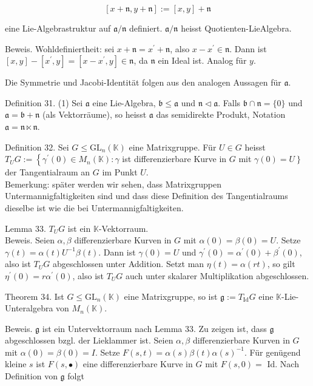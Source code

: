 \documentclass[10pt, letterpaper]{article}
\begin{document}
$$
[x+\mathfrak{n}, y+\mathfrak{n}]:=[x, y]+\mathfrak{n}
$$

eine Lie-Algebrastruktur auf $\mathfrak{a} / \mathfrak{n}$ definiert. $\mathfrak{a} / \mathfrak{n}$ heisst Quotienten-LieAlgebra.

Beweis. Wohldefiniertheit: sei $x+\mathfrak{n}=x^{\prime}+\mathfrak{n}$, also $x-x^{\prime} \in \mathfrak{n}$. Dann ist $[x, y]-\left[x^{\prime}, y\right]=\left[x-x^{\prime}, y\right] \in \mathfrak{n}$, da $\mathfrak{n}$ ein Ideal ist. Analog für $y$.

Die Symmetrie und Jacobi-Identität folgen aus den analogen Aussagen für $\mathfrak{a}$.

Definition 31. (1) Sei $\mathfrak{a}$ eine Lie-Algebra, $\mathfrak{b} \leq \mathfrak{a}$ und $\mathfrak{n} \triangleleft \mathfrak{a}$. Falls $\mathfrak{b} \cap \mathfrak{n}=\{0\}$ und $\mathfrak{a}=\mathfrak{b}+\mathfrak{n}$ (als Vektorräume), so heisst $\mathfrak{a}$ das semidirekte Produkt, Notation $\mathfrak{a}=\mathfrak{n} \ltimes \mathfrak{n}$.

Definition 32. Sei $G \leq \mathrm{GL}_{n}(\mathbb{K})$ eine Matrixgruppe. Für $U \in G$ heisst\\
$T_{U} G:=\left\{\gamma^{\prime}(0) \in M_{n}(\mathbb{K}): \gamma\right.$ ist differenzierbare Kurve in $G$ mit $\left.\gamma(0)=U\right\}$\\
der Tangentialraum an $G$ im Punkt $U$.\\
Bemerkung: später werden wir sehen, dass Matrixgruppen Untermannigfaltigkeiten sind und dass diese Definition des Tangentialraums dieselbe ist wie die bei Untermannigfaltigkeiten.

Lemma 33. $T_{U} G$ ist ein $\mathbb{K}$-Vektorraum.\\
Beweis. Seien $\alpha, \beta$ differenzierbare Kurven in $G$ mit $\alpha(0)=\beta(0)= U$. Setze $\gamma(t)=\alpha(t) U^{-1} \beta(t)$. Dann ist $\gamma(0)=U$ und $\gamma^{\prime}(0)=\alpha^{\prime}(0)+ \beta^{\prime}(0)$, also ist $T_{U} G$ abgeschlossen unter Addition. Setzt man $\eta(t)= \alpha(r t)$, so gilt $\eta^{\prime}(0)=r \alpha^{\prime}(0)$, also ist $T_{U} G$ auch unter skalarer Multiplikation abgeschlossen.

Theorem 34. Ist $G \leq \mathrm{GL}_{n}(\mathbb{K})$ eine Matrixgruppe, so ist $\mathfrak{g}:=T_{\mathrm{Id}} G$ eine $\mathbb{K}$-Lie-Unteralgebra von $M_{n}(\mathbb{K})$.

Beweis. $\mathfrak{g}$ ist ein Untervektorraum nach Lemma 33. Zu zeigen ist, dass $\mathfrak{g}$ abgeschlossen bzgl. der Lieklammer ist. Seien $\alpha, \beta$ differenzierbare Kurven in $G$ mit $\alpha(0)=\beta(0)=I$. Setze $F(s, t)=\alpha(s) \beta(t) \alpha(s)^{-1}$. Für genügend kleine $s$ ist $F(s, \bullet)$ eine differenzierbare Kurve in $G$ mit $F(s, 0)=$ Id. Nach Definition von $\mathfrak{g}$ folgt
\end{document}

